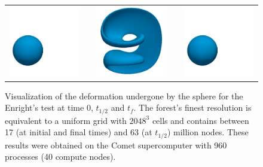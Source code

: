 \begin{figure}[htbp]
\begin{center}
\begin{tabular}{ccccc}
\includegraphics[width=.28\textwidth]{figures/enright_blue_0.png}
&
\hspace{.1cm}
&
\includegraphics[width=.28\textwidth]{figures/enright_blue_1.png}
&
\hspace{.1cm}
&
\includegraphics[width=.28\textwidth]{figures/enright_blue_2.png}
\end{tabular}
\caption{Visualization of the deformation undergone by the sphere for the Enright's test at time 0, $t_{1/2}$ and $t_f$. The forest's finest resolution is equivalent to a uniform grid with $2048^3$ cells and contains between 17 (at initial and final times) and 63 (at $t_{1/2}$) million nodes. These results were obtained on the Comet supercomputer with 960 processes (40 compute nodes).} \label{fig:accuracy}
\end{center}
\end{figure}
